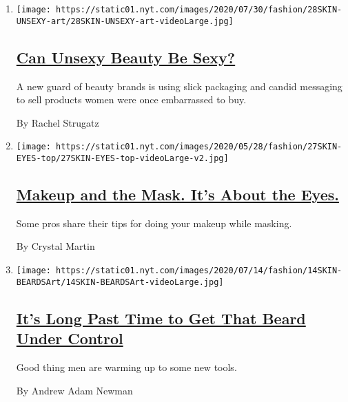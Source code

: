 \begin{enumerate}
\def\labelenumi{\arabic{enumi}.}
\item
  \texttt{[image: https://static01.nyt.com/images/2020/07/30/fashion/28SKIN-UNSEXY-art/28SKIN-UNSEXY-art-videoLarge.jpg]}

  \hypertarget{can-unsexy-beauty-be-sexy-1}{%
  \subsection{\texorpdfstring{\href{/2020/07/28/style/can-unsexy-beauty-be-sexy.html}{Can
  Unsexy Beauty Be
  Sexy?}}{Can Unsexy Beauty Be Sexy?}}\label{can-unsexy-beauty-be-sexy-1}}

  A new guard of beauty brands is using slick packaging and candid
  messaging to sell products women were once embarrassed to buy.

  By Rachel Strugatz
\item
  \texttt{[image: https://static01.nyt.com/images/2020/05/28/fashion/27SKIN-EYES-top/27SKIN-EYES-top-videoLarge-v2.jpg]}

  \hypertarget{makeup-and-the-mask-its-about-the-eyes}{%
  \subsection{\texorpdfstring{\href{/2020/05/26/style/makeup-and-the-mask-its-about-the-eyes.html}{Makeup
  and the Mask. It's About the
  Eyes.}}{Makeup and the Mask. It's About the Eyes.}}\label{makeup-and-the-mask-its-about-the-eyes}}

  Some pros share their tips for doing your makeup while masking.

  By Crystal Martin
\item
  \texttt{[image: https://static01.nyt.com/images/2020/07/14/fashion/14SKIN-BEARDSArt/14SKIN-BEARDSArt-videoLarge.jpg]}

  \hypertarget{its-long-past-time-to-get-that-beard-under-control}{%
  \subsection{\texorpdfstring{\href{/2020/07/15/style/its-long-past-time-to-get-that-beard-under-control.html}{It's
  Long Past Time to Get That Beard Under
  Control}}{It's Long Past Time to Get That Beard Under Control}}\label{its-long-past-time-to-get-that-beard-under-control}}

  Good thing men are warming up to some new tools.

  By Andrew Adam Newman
\end{enumerate}

